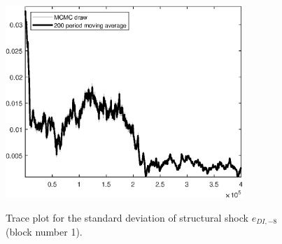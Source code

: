 \begin{figure}[H]
\centering
  \includegraphics[width=0.8\textwidth]{BRS_sectoral/graphs/TracePlot_SE_e_DI_news_8_blck_1}\\
    \caption{Trace plot for the standard deviation of structural shock ${e_{DI,-8}}$ (block number 1).}
\end{figure}
